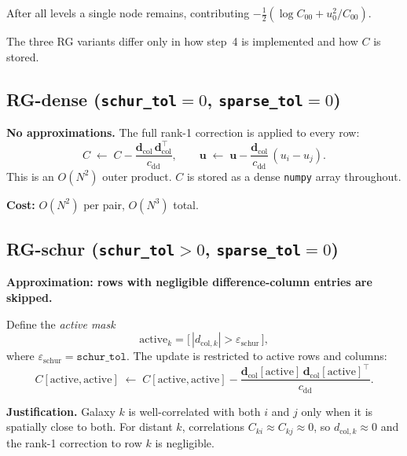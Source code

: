 \documentclass[11pt]{article}
\begin{document}
After all levels a single node remains, contributing
$-\tfrac{1}{2}(\log C_{00} + u_0^2/C_{00})$.

The three RG variants differ only in how step~4 is implemented
and how $C$ is stored.

\subsection{RG-dense (\texttt{schur\_tol}$=0$, \texttt{sparse\_tol}$=0$)}

\textbf{No approximations.}
The full rank-1 correction is applied to every row:
\begin{equation}
  C \;\leftarrow\; C
  - \frac{\mathbf{d}_\mathrm{col}\,\mathbf{d}_\mathrm{col}^\top}{c_\mathrm{dd}},
  \qquad
  \mathbf{u} \;\leftarrow\; \mathbf{u}
  - \frac{\mathbf{d}_\mathrm{col}}{c_\mathrm{dd}}\,(u_i - u_j).
\end{equation}
This is an $O(N^2)$ outer product.
$C$ is stored as a dense \texttt{numpy} array throughout.

\noindent\textbf{Cost:} $O(N^2)$ per pair, $O(N^3)$ total.

\subsection{RG-schur (\texttt{schur\_tol}$>0$, \texttt{sparse\_tol}$=0$)}

\textbf{Approximation: rows with negligible difference-column entries
are skipped.}

Define the \emph{active mask}
\begin{equation}
  \mathrm{active}_k
  = \bigl[\,|d_{\mathrm{col},k}| > \varepsilon_\mathrm{schur}\,\bigr],
\end{equation}
where $\varepsilon_\mathrm{schur} = \texttt{schur\_tol}$.
The update is restricted to active rows and columns:
\begin{equation}
  C[\mathrm{active},\mathrm{active}]
  \;\leftarrow\;
  C[\mathrm{active},\mathrm{active}]
  - \frac{\mathbf{d}_\mathrm{col}[\mathrm{active}]\,
          \mathbf{d}_\mathrm{col}[\mathrm{active}]^\top}{c_\mathrm{dd}}.
\end{equation}

\textbf{Justification.}
Galaxy $k$ is well-correlated with both $i$ and $j$ only when it is
spatially close to both.
For distant $k$, correlations $C_{ki} \approx C_{kj} \approx 0$,
so $d_{\mathrm{col},k} \approx 0$ and the rank-1 correction to row $k$
is negligible.
\end{document}
